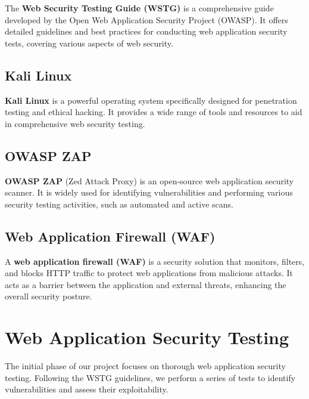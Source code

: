 \documentclass[12pt]{article}
\begin{document}
The \textbf{Web Security Testing Guide (WSTG)} is a comprehensive guide developed by the Open Web Application Security Project (OWASP). It offers detailed guidelines and best practices for conducting web application security tests, covering various aspects of web security.

\subsection{Kali Linux}

\textbf{Kali Linux} is a powerful operating system specifically designed for penetration testing and ethical hacking. It provides a wide range of tools and resources to aid in comprehensive web security testing.

\subsection{OWASP ZAP}

\textbf{OWASP ZAP} (Zed Attack Proxy) is an open-source web application security scanner. It is widely used for identifying vulnerabilities and performing various security testing activities, such as automated and active scans.

\newpage

\subsection{Web Application Firewall (WAF)}

A \textbf{web application firewall (WAF)} is a security solution that monitors, filters, and blocks HTTP traffic to protect web applications from malicious attacks. It acts as a barrier between the application and external threats, enhancing the overall security posture.

\newpage

\section{Web Application Security Testing}

The initial phase of our project focuses on thorough web application security testing. Following the WSTG guidelines, we perform a series of tests to identify vulnerabilities and assess their exploitability.
\end{document}
